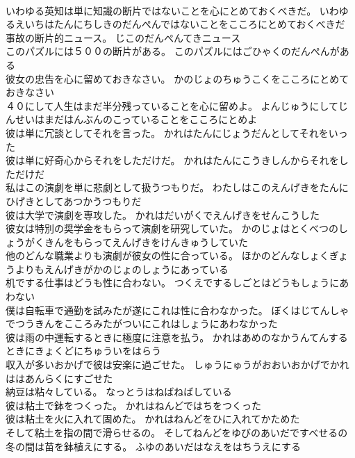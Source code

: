\documentclass[8pt]{extreport}
\begin{document}
\begin{CJK}{UTF8}{min}
\\	いわゆる英知は単に知識の断片ではないことを心にとめておくべきだ。	いわゆるえいちはたんにちしきのだんぺんではないことをこころにとめておくべきだ 
\\	事故の断片的ニュース。	じこのだんぺんてきニュース 
\\	このパズルには５００の断片がある。	このパズルにはごひゃくのだんぺんがある 
\\	彼女の忠告を心に留めておきなさい。	かのじょのちゅうこくをこころにとめておきなさい 
\\	４０にして人生はまだ半分残っていることを心に留めよ。	よんじゅうにしてじんせいはまだはんぶんのこっていることをこころにとめよ 
\\	彼は単に冗談としてそれを言った。	かれはたんにじょうだんとしてそれをいった 
\\	彼は単に好奇心からそれをしただけだ。	かれはたんにこうきしんからそれをしただけだ 
\\	私はこの演劇を単に悲劇として扱うつもりだ。	わたしはこのえんげきをたんにひげきとしてあつかうつもりだ 
\\	彼は大学で演劇を専攻した。	かれはだいがくでえんげきをせんこうした 
\\	彼女は特別の奨学金をもらって演劇を研究していた。	かのじょはとくべつのしょうがくきんをもらってえんげきをけんきゅうしていた 
\\	他のどんな職業よりも演劇が彼女の性に合っている。	ほかのどんなしょくぎょうよりもえんげきがかのじょのしょうにあっている 
\\	机でする仕事はどうも性に合わない。	つくえでするしごとはどうもしょうにあわない 
\\	僕は自転車で通勤を試みたが遂にこれは性に合わなかった。	ぼくはじてんしゃでつうきんをこころみたがついにこれはしょうにあわなかった 
\\	彼は雨の中運転するときに極度に注意を払う。	かれはあめのなかうんてんするときにきょくどにちゅういをはらう 
\\	収入が多いおかげで彼は安楽に過ごせた。	しゅうにゅうがおおいおかげでかれははあんらくにすごせた 
\\	納豆は粘々している。	なっとうはねばねばしている 
\\	彼は粘土で鉢をつくった。	かれはねんどではちをつくった 
\\	彼は粘土を火に入れて固めた。	かれはねんどをひに入れてかためた 
\\	そして粘土を指の間で滑らせるの。	そしてねんどをゆびのあいだですべせるの 
\\	冬の間は苗を鉢植えにする。	ふゆのあいだはなえをはちうえにする 

\end{CJK}
\end{document}
